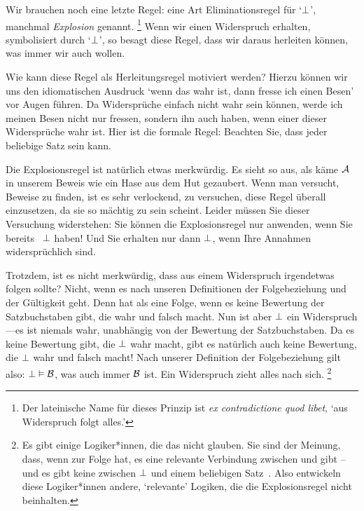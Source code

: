Wir brauchen noch eine letzte Regel: eine Art Eliminationsregel für `$\bot$', manchmal \emph{Explosion} genannt. \footnote{Der lateinische Name für dieses Prinzip ist \emph{ex contradictione quod libet}, `aus Widerspruch folgt alles.'} Wenn wir einen Widerspruch erhalten, symbolisiert durch `$\bot$', so besagt diese Regel, dass wir daraus herleiten können, was immer wir auch wollen. 

Wie kann diese Regel als Herleitungsregel motiviert werden? Hierzu können wir uns den idiomatischen Ausdruck `wenn das wahr ist, dann fresse ich einen Besen' vor Augen führen. Da Widersprüche einfach nicht wahr sein können, werde ich meinen Besen nicht nur fressen, sondern ihn auch haben, wenn einer dieser Widersprüche wahr ist. Hier ist die formale Regel:
Beachten Sie, dass jeder beliebige Satz sein kann.

Die Explosionsregel ist natürlich etwas merkwürdig. Es sieht so aus, als käme $\mathcal{A}$ in unserem Beweis wie ein Hase aus dem Hut gezaubert. Wenn man versucht, Beweise zu finden, ist es sehr verlockend, zu versuchen, diese Regel überall einzusetzen, da sie so mächtig zu sein scheint. Leider müssen Sie dieser Versuchung widerstehen: Sie können die Explosionsregel nur anwenden, wenn Sie bereits ~$\bot$ haben! Und Sie erhalten nur dann $\bot$, wenn Ihre Annahmen widersprüchlich sind.

Trotzdem, ist es nicht merkwürdig, dass aus einem Widerspruch irgendetwas folgen sollte? Nicht, wenn es nach unseren Definitionen der Folgebeziehung und der Gültigkeit geht. Denn  hat  als eine Folge, wenn es keine Bewertung der Satzbuchstaben gibt, die  wahr und  falsch macht. Nun ist aber $\bot$ ein Widerspruch---es ist niemals wahr, unabhängig von der Bewertung der Satzbuchstaben. Da es keine Bewertung gibt, die $\bot$ wahr macht, gibt es natürlich auch keine Bewertung, die $\bot$ wahr und  falsch macht! Nach unserer Definition der Folgebeziehung gilt also: $\bot \vDash \mathcal{B}$, was auch immer $\mathcal{B}$ ist. Ein Widerspruch zieht alles nach sich. \footnote{Es gibt einige Logiker*innen, die das nicht glauben. Sie sind der Meinung, dass, wenn   zur Folge hat, es eine relevante Verbindung zwischen  und  gibt -- und es gibt keine zwischen $\bot$ und einem beliebigen Satz~. Also entwickeln diese Logiker*innen andere, `relevante' Logiken, die die Explosionsregel nicht beinhalten.}

